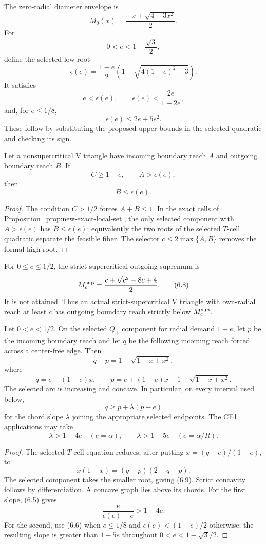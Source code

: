 The zero-radial diameter envelope is
\[
 M_0(x)=\frac{-x+\sqrt{4-3x^2}}2.
 \tag{6.3}
\]
For
\[
 0<e<1-\frac{\sqrt3}{2},
\]
define the selected low root
\[
 \epsilon(e)=\frac{1-e}{2}
 \left(1-\sqrt{4(1-e)^2-3}\right).
 \tag{6.4}
\]
It satisfies
\[
 e<\epsilon(e),\qquad
 \epsilon(e)<\frac{2e}{1-2e},
 \tag{6.5}
\]
and, for $e\le1/8$,
\[
 \epsilon(e)\le2e+5e^2.
 \tag{6.6}
\]
These follow by substituting the proposed upper bounds in the selected
quadratic and checking its sign.

\begin{lemma}
\label{lem:new-direct-threshold}
Let a nonsupercritical V triangle have incoming boundary reach $A$ and
outgoing boundary reach $B$.  If
\[
 C\ge1-e,
 \qquad
 A>\epsilon(e),
\]
then
\[
 \boxed{B\le\epsilon(e).}
 \tag{6.7}
\]
\end{lemma}

\begin{proof}
The condition $C>1/2$ forces $A+B\le1$.  In the exact cells of
Proposition~\ref{prop:new-exact-local-set}, the only selected component with
$A>\epsilon(e)$ has $B\le\epsilon(e)$; equivalently the two roots of the
selected $T$-cell quadratic separate the feasible fiber.  The selector
$c\le2\max\{A,B\}$ removes the formal high root.
\end{proof}

For $0\le c\le1/2$, the strict-supercritical outgoing supremum is
\[
 M_c^{\rm sup}
 =\frac{c+\sqrt{c^2-8c+4}}2.
 \tag{6.8}
\]
It is not attained.  Thus an actual strict-supercritical V triangle with
own-radial reach at least $c$ has outgoing boundary reach strictly below
$M_c^{\rm sup}$.

\begin{lemma}
\label{lem:new-selected-chords}
Let $0<e<1/2$.  On the selected $Q_+$ component for radial demand $1-e$,
let $p$ be the incoming boundary reach and let $q$ be the following incoming
reach forced across a center-free edge.  Then
\[
 q-p=1-\sqrt{1-x+x^2},
\]
where
\[
 q=e+(1-e)x,
 \qquad
 p=e+(1-e)x-1+\sqrt{1-x+x^2}.
 \tag{6.9}
\]
The selected arc is increasing and concave.  In particular, on every interval
used below,
\[
 q\ge p+\lambda(p-e)
 \tag{6.10}
\]
for the chord slope $\lambda$ joining the appropriate selected endpoints.
The CE1 applications may take
\[
 \lambda>1-4e
 \quad(e=\alpha),
 \qquad
 \lambda>1-5e
 \quad(e=\alpha/R).
 \tag{6.11}
\]
\end{lemma}

\begin{proof}
The selected $T$-cell equation reduces, after putting
$x=(q-e)/(1-e)$, to
\[
 x(1-x)=(q-p)(2-q+p).
\]
The selected component takes the smaller root, giving (6.9).  Strict
concavity follows by differentiation.  A concave graph lies above its chords.
For the first slope, (6.5) gives
\[
 \frac{e}{\epsilon(e)-e}>1-4e.
\]
For the second, use (6.6) when $e\le1/8$ and
$\epsilon(e)<(1-e)/2$ otherwise; the resulting slope is greater than
$1-5e$ throughout $0<e<1-\sqrt3/2$.
\end{proof}
